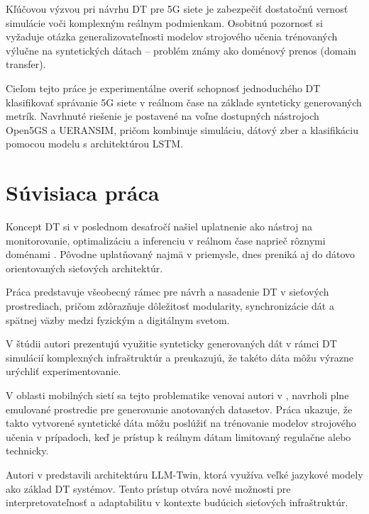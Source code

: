 \documentclass[a4paper,10pt]{ieeetran}
\begin{document}
Kľúčovou výzvou pri návrhu DT pre 5G siete je zabezpečiť dostatočnú vernosť simulácie voči komplexným reálnym podmienkam. Osobitnú pozornosť si vyžaduje otázka generalizovateľnosti modelov strojového učenia trénovaných výlučne na syntetických dátach – problém známy ako doménový prenos (domain transfer).

Cieľom tejto práce je experimentálne overiť schopnosť jednoduchého DT klasifikovať správanie 5G siete v reálnom čase na základe synteticky generovaných metrík. Navrhnuté riešenie je postavené na voľne dostupných nástrojoch Open5GS a UERANSIM, pričom kombinuje simuláciu, dátový zber a klasifikáciu pomocou modelu s architektúrou LSTM.



\section{Súvisiaca práca}
\label{sec_relatedwork}

Koncept DT si v poslednom desaťročí našiel uplatnenie ako nástroj na monitorovanie, optimalizáciu a inferenciu v reálnom čase naprieč rôznymi doménami \cite{app_of_dt}. Pôvodne uplatňovaný najmä v priemysle, dnes preniká aj do dátovo orientovaných sieťových architektúr. 

Práca \cite{ieee_dt_framework} predstavuje všeobecný rámec pre návrh a nasadenie DT v sieťových prostrediach, pričom zdôrazňuje dôležitosť modularity, synchronizácie dát a spätnej väzby medzi fyzickým a digitálnym svetom. 

V štúdii \cite{synthetic_dt_ai} autori prezentujú využitie synteticky generovaných dát v rámci DT simulácií komplexných infraštruktúr a preukazujú, že takéto dáta môžu výrazne urýchliť experimentovanie. 

V oblasti mobilných sietí sa tejto problematike venovai autori v \cite{colonna_thesis}, navrholi plne emulované prostredie pre generovanie anotovaných datasetov. Práca ukazuje, že takto vytvorené syntetické dáta môžu poslúžiť na trénovanie modelov strojového učenia v prípadoch, keď je prístup k reálnym dátam limitovaný regulačne alebo technicky. 

Autori v \cite{llm_twin_nature} predstavili architektúru LLM-Twin, ktorá využíva veľké jazykové modely ako základ DT systémov. Tento prístup otvára nové možnosti pre interpretovateľnosť a adaptabilitu v kontexte budúcich sieťových infraštruktúr.
\end{document}
